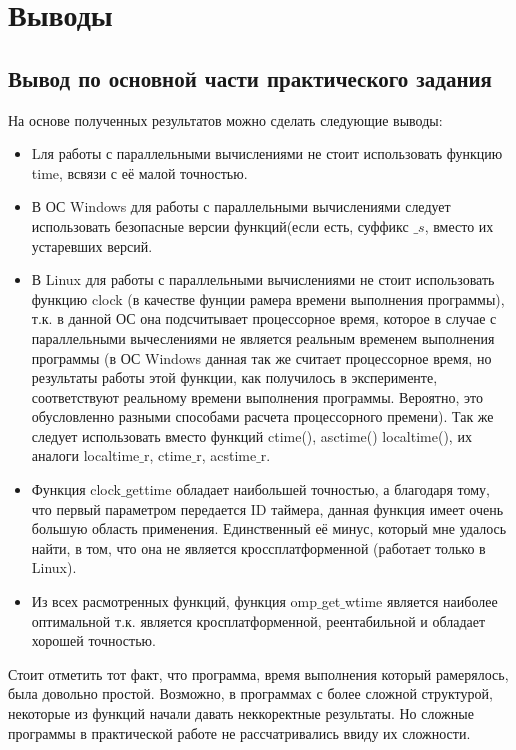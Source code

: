 \documentclass{article}
\begin{document}
		\section{Выводы}
		\subsection{Вывод по основной части практического задания}
				На основе полученных результатов можно сделать следующие выводы:
			\begin{itemize}
				\item Lля работы с параллельными вычислениями не стоит использовать функцию time, всвязи с её малой 							точностью.
				\item В ОС Windows для работы с параллельными вычислениями следует использовать безопасные версии функций(если 					есть, суффикс $\_s$, вместо их устаревших версий.
				\item В Linux для работы с параллельными вычислениями не стоит использовать функцию clock (в качестве фунции 					рамера времени выполнения программы), т.к. в данной ОС она подсчитывает процессорное время, которое в случае с 						параллельными вычеслениями не является реальным временем выполнения программы (в ОС Windows данная так же считает 					процессорное время, но результаты работы этой функции, как получилось в эксперименте, соответствуют реальному времени 			выполнения программы. Вероятно, это обусловленно разными способами расчета процессорного премени). Так же следует 					использовать вместо функций ctime(), asctime() localtime(), их аналоги localtime$\_$r, ctime$\_$r, acstime$\_$r.
				\item Функция clock$\_$gettime обладает наибольшей точностью, а благодаря тому, что первый параметром передается 				ID таймера, данная функция имеет очень большую область применения. Единственный её минус, который мне удалось найти, 				в том, что она не является 	кроссплатформенной (работает только в Linux).	
				\item Из всех расмотренных функций, функция omp$\_$get$\_$wtime является наиболее оптимальной т.к. является 					кросплатформенной, реентабильной и обладает хорошей точностью.
			\end{itemize}
			
				Стоит отметить тот факт, что программа, время выполнения который рамерялось, была довольно простой. Возможно, в 				программах с более сложной структурой, некоторые из функций начали давать неккоректные результаты. Но сложные 						программы в практической работе не рассчатривались ввиду их сложности.
				
\end{document}
